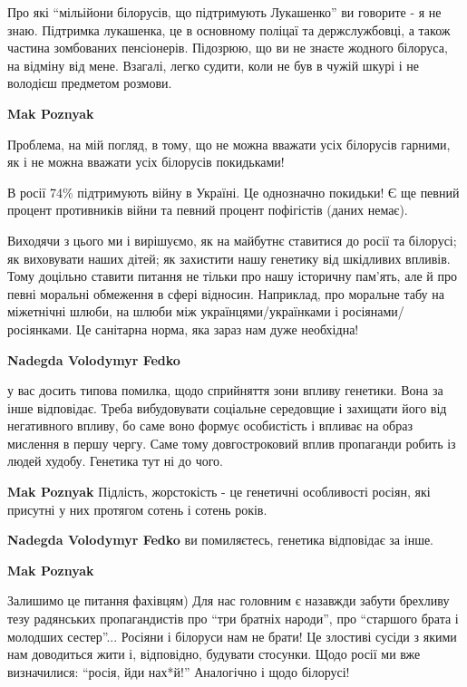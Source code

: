 \begin{itemize}
\begin{itemize}
Про які \enquote{мільійони білорусів, що підтримують Лукашенко} ви говорите - я
не знаю. Підтримка лукашенка, це в основному поліцаї та держслужбовці, а також
частина зомбованих пенсіонерів. Підозрюю, що ви не знаєте жодного білоруса, на
відміну від мене. Взагалі, легко судити, коли не був в чужій шкурі і не
володієш предметом розмови.

\textbf{Mak Poznyak} 

Проблема, на мій погляд, в тому, що не можна вважати усіх білорусів гарними, як
і не можна вважати усіх білорусів покидьками!

В росії 74\% підтримують війну в Україні. Це однозначно покидьки! Є ще певний
процент противників війни та певний процент пофігістів (даних немає).

Виходячи з цього ми і вирішуємо, як на майбутнє ставитися до росії та білорусі;
як виховувати наших дітей; як захистити нашу генетику від шкідливих впливів.
Тому доцільно ставити питання не тільки про нашу історичну пам'ять, але й про
певні моральні обмеження в сфері відносин. Наприклад, про моральне табу на
міжетнічні шлюби, на шлюби між українцями/українками і росіянами/росіянками. Це
санітарна норма, яка зараз нам дуже необхідна!

\textbf{Nadegda Volodymyr Fedko} 

у вас досить типова помилка, щодо сприйняття зони впливу генетики. Вона за інше
відповідає. Треба вибудовувати соціальне середовщие і захищати його від
негативного впливу, бо саме воно формує особистість і впливає на образ мислення
в першу чергу. Саме тому довгостроковий вплив пропаганди робить із людей
худобу. Генетика тут ні до чого.

\textbf{Mak Poznyak} Підлість, жорстокість - це генетичні особливості росіян, які присутні у них протягом сотень і сотень років.

\textbf{Nadegda Volodymyr Fedko} ви помиляєтесь, генетика відповідає за інше.

\textbf{Mak Poznyak} 

Залишимо це питання фахівцям) Для нас головним є назавжди забути брехливу тезу
радянських пропагандистів про \enquote{три братніх народи}, про \enquote{старшого брата і
молодших сестер}... Росіяни і білоруси нам не брати! Це злостиві сусіди з якими
нам доводиться жити і, відповідно, будувати стосунки. Щодо росії ми вже
визначилися: \enquote{росія, йди нах*й!} Аналогічно і щодо білорусі!


\end{itemize}
\end{itemize}
